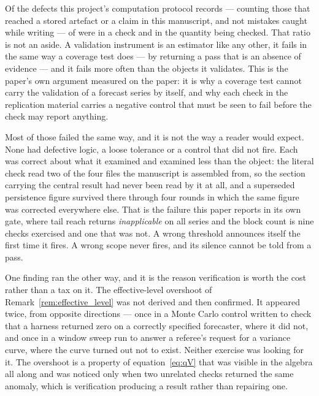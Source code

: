 \documentclass[preprint,11pt,authoryear]{elsarticle}
\newcommand{\1}{\boldsymbol{1}}
\begin{document}
 Of the defects this project's computation protocol records --- counting those
that reached a stored artefact or a claim in this manuscript, and not mistakes
caught while writing ---
\nHarnessDefectsInstrument{} of \nHarnessDefectsTotal{} were in a check and
\nHarnessDefectsObject{} in the quantity being checked. That ratio is not an
aside. A validation instrument is an estimator like any other, it fails in the
same way a coverage test does --- by returning a pass that is an absence of
evidence --- and it fails more often than the objects it validates. This is the
paper's own argument measured on the paper: it is why a coverage test cannot
carry the validation of a forecast series by itself, and why each check in the
replication material carries a negative control that must be seen to fail before
the check may report anything.

Most of those \nHarnessDefectsInstrument{} failed the same way, and it is not
the way a reader would expect. None had defective logic, a loose tolerance or a
control that did not fire. Each was correct about what it examined and examined
less than the object: the literal check read two of the four files the
manuscript is assembled from, so the section carrying the central result had
never been read by it at all, and a superseded persistence figure survived there
through four rounds in which the same figure was corrected everywhere else. That
is the failure this paper reports in its own gate, where tail reach returns
\emph{inapplicable} on all \nGateSeries{} series and the block count is nine
checks exercised and one that was not. A wrong threshold announces itself the
first time it fires. A wrong scope never fires, and its silence cannot be told
from a pass.

One finding ran the other way, and it is the reason verification is worth the
cost rather than a tax on it. The effective-level overshoot of
Remark~\ref{rem:effective_level} was not derived and then confirmed. It appeared
twice, from opposite directions --- once in a Monte Carlo control written to
check that a harness returned zero on a correctly specified forecaster, where it
did not, and once in a window sweep run to answer a referee's request for a
variance curve, where the curve turned out not to exist. Neither exercise was
looking for it. The overshoot is a property of equation~\eqref{eq:qV} that was
visible in the algebra all along and was noticed only when two unrelated checks
returned the same anomaly, which is verification producing a result rather than
repairing one.
\end{document}

